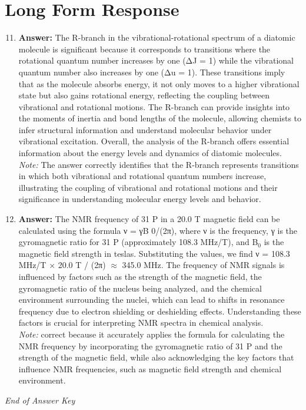 \documentclass[12pt]{article}
\begin{document}
\section*{Long Form Response}
\begin{enumerate}[label=\arabic*.]
\setcounter{enumi}{10}
\item \textbf{Answer:} The R-branch in the vibrational-rotational spectrum of a diatomic molecule is significant because it corresponds to transitions where the rotational quantum number increases by one (ΔJ = 1) while the vibrational quantum number also increases by one (Δu = 1). These transitions imply that as the molecule absorbs energy, it not only moves to a higher vibrational state but also gains rotational energy, reflecting the coupling between vibrational and rotational motions. The R-branch can provide insights into the moments of inertia and bond lengths of the molecule, allowing chemists to infer structural information and understand molecular behavior under vibrational excitation. Overall, the analysis of the R-branch offers essential information about the energy levels and dynamics of diatomic molecules.
\\ \textit{Note:} The answer correctly identifies that the R-branch represents transitions in which both vibrational and rotational quantum numbers increase, illustrating the coupling of vibrational and rotational motions and their significance in understanding molecular energy levels and behavior.
\item \textbf{Answer:} The NMR frequency of 31 P in a 20.0 T magnetic field can be calculated using the formula ν = γB 0/(2π), where ν is the frequency, γ is the gyromagnetic ratio for 31 P (approximately 108.3 MHz/T), and B$_{0}$ is the magnetic field strength in teslas. Substituting the values, we find ν = 108.3 MHz/T \ensuremath{\times} 20.0 T / (2π) \ensuremath{\approx} 345.0 MHz. The frequency of NMR signals is influenced by factors such as the strength of the magnetic field, the gyromagnetic ratio of the nucleus being analyzed, and the chemical environment surrounding the nuclei, which can lead to shifts in resonance frequency due to electron shielding or deshielding effects. Understanding these factors is crucial for interpreting NMR spectra in chemical analysis.
\\ \textit{Note:} correct because it accurately applies the formula for calculating the NMR frequency by incorporating the gyromagnetic ratio of 31 P and the strength of the magnetic field, while also acknowledging the key factors that influence NMR frequencies, such as magnetic field strength and chemical environment.
\end{enumerate}

\vfill
\noindent\textit{End of Answer Key}
\end{document}
